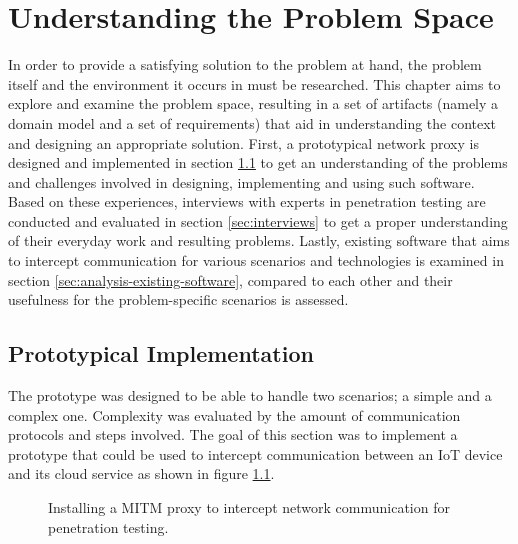 \chapter{Understanding the Problem Space}
\label{chap:understanding-the-problem-space}
In order to provide a satisfying solution to the problem at hand, the problem itself and the environment it occurs in must be researched. This chapter aims to explore and examine the problem space, resulting in a set of artifacts (namely a domain model and a set of requirements) that aid in understanding the context and designing an appropriate solution. First, a prototypical network proxy is designed and implemented in section \ref{sec:prototypical-implementation} to get an understanding of the problems and challenges involved in designing, implementing and using such software. Based on these experiences, interviews with experts in penetration testing are conducted and evaluated in section \ref{sec:interviews} to get a proper understanding of their everyday work and resulting problems. Lastly, existing software that aims to intercept communication for various scenarios and technologies is examined in section \ref{sec:analysis-existing-software}, compared to each other and their usefulness for the problem-specific scenarios is assessed.

\section{Prototypical Implementation}
\label{sec:prototypical-implementation}
The prototype was designed to be able to handle two scenarios; a simple and a complex one. Complexity was evaluated by the amount of communication protocols and steps involved. The goal of this section was to implement a prototype that could be used to intercept communication between an \ac{IoT} device and its cloud service as shown in figure \ref{fig:network-communication-diagrams}.   

\begin{figure}%
    \centering
    \qquad
    \caption{Installing a \ac{MITM} proxy to intercept network communication for penetration testing.}%
    \label{fig:network-communication-diagrams}%
\end{figure}

